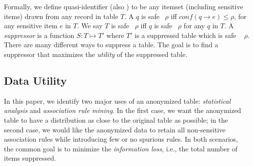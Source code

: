 Formally, we define {quasi-identifier} (also \qid) to be any itemset
(including sensitive items) drawn from any record in table $T$. 
A \qid $q$ is safe \wrt~$\rho$ iff $conf(q \rightarrow e)\leq\rho$,
for any sensitive item $e$ in $T$.
We say $T$ is safe \wrt~$\rho$ iff $q$ is safe \wrt~$\rho$ for any
\qid $q$ in $T$.
A \emph{suppressor} is a function
$S : T \mapsto T'$ where $T'$ is a suppressed table which is
safe \wrt~ $\rho$.
There are many different ways to suppress a table. The goal
is to find a suppressor that maximizes the {\em utility} of the suppressed
table.

\subsection{Data Utility}
\label{sec:du}
In this paper, we identify two major uses of an anonymized table: 
{\em statistical analysis} and {\em association rule mining}. 
In the first case, we want the anonymized table to have a distribution 
as close to the original table as possible; 
in the second case, 
we would like the anonymized data to
retain all non-sensitive association rules while introducing few 
or no spurious rules.
In both scenarios, the common goal is
to minimize the {\em information loss}, i.e.,
the total number of items suppressed.

